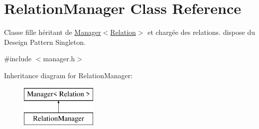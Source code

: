 \hypertarget{class_relation_manager}{}\section{Relation\+Manager Class Reference}
\label{class_relation_manager}


Classe fille héritant de \hyperlink{class_manager}{Manager$<$\+Relation$>$} et chargée des relations. dispose du Deseign Pattern Singleton.  




{\ttfamily \#include $<$manager.\+h$>$}

Inheritance diagram for Relation\+Manager\+:\begin{figure}[H]
\begin{center}
\leavevmode
\includegraphics[height=2.000000cm]{class_relation_manager}
\end{center}
\end{figure}
